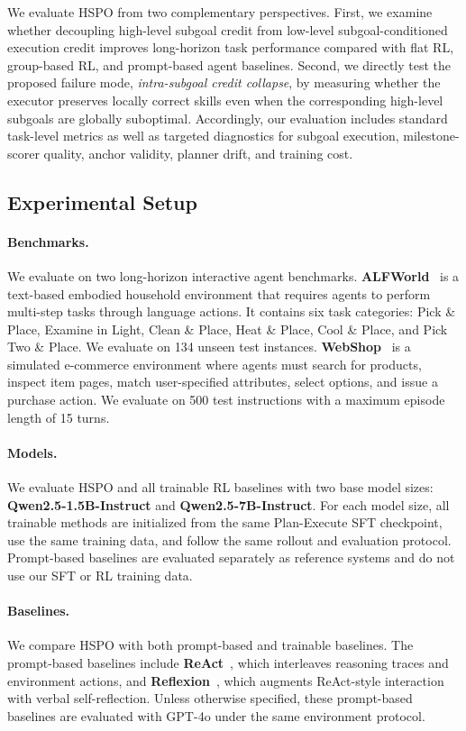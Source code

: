 \documentclass{article}
\begin{document}
We evaluate HSPO from two complementary perspectives. First, we examine whether decoupling high-level subgoal credit from low-level subgoal-conditioned execution credit improves long-horizon task performance compared with flat RL, group-based RL, and prompt-based agent baselines. Second, we directly test the proposed failure mode, \emph{intra-subgoal credit collapse}, by measuring whether the executor preserves locally correct skills even when the corresponding high-level subgoals are globally suboptimal. Accordingly, our evaluation includes standard task-level metrics as well as targeted diagnostics for subgoal execution, milestone-scorer quality, anchor validity, planner drift, and training cost.

\subsection{Experimental Setup}
\label{sec:exp_setup}

\paragraph{Benchmarks.}
We evaluate on two long-horizon interactive agent benchmarks. \textbf{ALFWorld}~\cite{shridhar2021alfworld} is a text-based embodied household environment that requires agents to perform multi-step tasks through language actions. It contains six task categories: Pick \& Place, Examine in Light, Clean \& Place, Heat \& Place, Cool \& Place, and Pick Two \& Place. We evaluate on 134 unseen test instances. \textbf{WebShop}~\cite{yao2022webshop} is a simulated e-commerce environment where agents must search for products, inspect item pages, match user-specified attributes, select options, and issue a purchase action. We evaluate on 500 test instructions with a maximum episode length of 15 turns.

\paragraph{Models.}
We evaluate HSPO and all trainable RL baselines with two base model sizes: \textbf{Qwen2.5-1.5B-Instruct} and \textbf{Qwen2.5-7B-Instruct}. For each model size, all trainable methods are initialized from the same Plan-Execute SFT checkpoint, use the same training data, and follow the same rollout and evaluation protocol. Prompt-based baselines are evaluated separately as reference systems and do not use our SFT or RL training data.

\paragraph{Baselines.}
We compare HSPO with both prompt-based and trainable baselines. The prompt-based baselines include \textbf{ReAct}~\cite{yao2022react}, which interleaves reasoning traces and environment actions, and \textbf{Reflexion}~\cite{shinn2023reflexion}, which augments ReAct-style interaction with verbal self-reflection. Unless otherwise specified, these prompt-based baselines are evaluated with GPT-4o under the same environment protocol.
\end{document}
